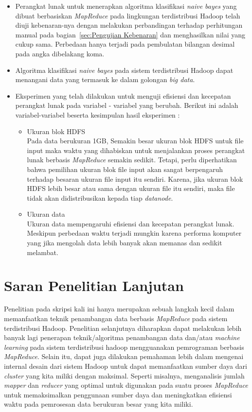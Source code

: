 \begin{itemize}
	\item Perangkat lunak untuk menerapkan algoritma klasifikasi \textit{naive bayes} yang dibuat berbasiskan \textit{MapReduce} pada lingkungan terdistribusi Hadoop telah diuji kebenaran-nya dengan melakukan perbandingan terhadap perhitungan manual pada bagian~\ref{sec:Pengujian Kebenaran} dan menghasilkan nilai yang cukup sama. Perbedaan hanya terjadi pada pembulatan bilangan desimal pada angka dibelakang koma.
	\item Algoritma klasifikasi \textit{naive bayes} pada sistem terdistribusi Hadoop dapat menangani data yang termasuk ke dalam golongan \textit{big data}.
	\item Eksperimen yang telah dilakukan untuk menguji efisiensi dan kecepatan perangkat lunak pada variabel - variabel yang berubah. Berikut ini adalah variabel-variabel beserta kesimpulan hasil eksperimen :
	\begin{itemize}
		\item Ukuran blok HDFS\\
		Pada data berukuran 1GB, Semakin besar ukuran blok HDFS untuk file input maka waktu yang dihabiskan untuk menjalankan proses perangkat lunak berbasis \textit{MapReduce} semakin sedikit. Tetapi, perlu diperhatikan bahwa pemilihan ukuran blok file input akan sangat berpengaruh terhadap besaran ukuran file input itu sendiri. Karena, jika ukuran blok HDFS lebih besar atau sama dengan ukuran file itu sendiri, maka file tidak akan didistribusikan kepada tiap \textit{datanode}.
		
		\item Ukuran data\\
		Ukuran data mempengaruhi efisiensi dan kecepatan perangkat lunak. Meskipun perbedaan waktu terjadi mungkin karena performa komputer yang jika mengolah data lebih banyak akan memanas dan sedikit melambat.
	\end{itemize}
\end{itemize}

\section{Saran Penelitian Lanjutan}

Penelitian pada skripsi kali ini hanya merupakan sebuah langkah kecil dalam memanfaatkan teknik penambangan data berbasis \textit{MapReduce} pada sistem terdistribusi Hadoop. Penelitian selanjutnya diharapkan dapat melakukan lebih banyak lagi penerapan teknik/algoritma penambangan data dan/atau \textit{machine learning} pada sistem terdistribusi hadoop mengguanakan pemrograman berbasis \textit{MapReduce}. Selain itu, dapat juga dilakukan pemahaman lebih dalam mengenai internal desain dari sistem Hadoop untuk dapat memanfaatkan sumber daya dari \textit{cluster} yang kita miliki dengan maksimal. Seperti misalnya, menganalisis jumlah \textit{mapper} dan \textit{reducer} yang optimal untuk digunakan pada suatu proses \textit{MapReduce} untuk memaksimalkan penggunaan sumber daya dan meningkatkan efisiensi waktu pada pemrosesan data berukuran besar yang kita miliki.


